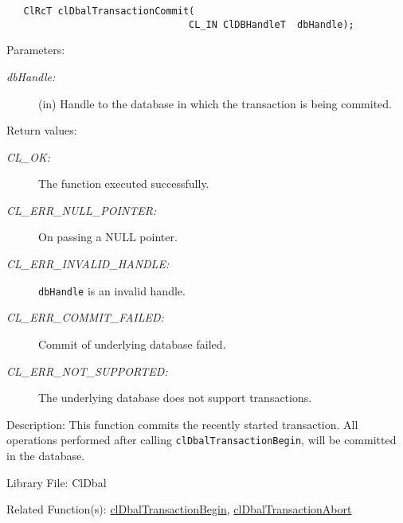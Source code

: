 \begin{flushleft}
\begin{Desc}
\footnotesize\begin{verbatim}   ClRcT clDbalTransactionCommit(
                          		CL_IN ClDBHandleT  dbHandle);
\end{verbatim}
\normalsize
\end{Desc}
\begin{Desc}
\item[Parameters:]
\begin{description}
\item[{\em db\-Handle:}](in) Handle to the database in which the transaction is being commited.\end{description}
\end{Desc}
\begin{Desc}
\item[Return values:]
\begin{description}
\item[{\em CL\_\-OK:}]The function executed successfully. 
\item[{\em CL\_\-ERR\_\-NULL\_\-POINTER:}]On passing a NULL pointer. 
\item[{\em CL\_\-ERR\_\-INVALID\_\-HANDLE:}]{\tt{dbHandle}} is an invalid handle. 
\item[{\em CL\_\-ERR\_\-COMMIT\_\-FAILED:}]Commit of underlying database failed. 
\item[{\em CL\_\-ERR\_\-NOT\_\-SUPPORTED:}]The underlying database does not support transactions.\end{description}
\end{Desc}
\begin{Desc}
\item[Description:]This function commits the recently started transaction. All operations performed after calling {\tt{cl\-Dbal\-Transaction\-Begin}}, 
will be committed in the database.\end{Desc}
\begin{Desc}
\item[Library File:]Cl\-Dbal\end{Desc}
\begin{Desc}
\item[Related Function(s):]\hyperlink{pagedbal111}{cl\-Dbal\-Transaction\-Begin}, \hyperlink{pagedbal113}{cl\-Dbal\-Transaction\-Abort} \end{Desc}


\newpage

\end{flushleft}
